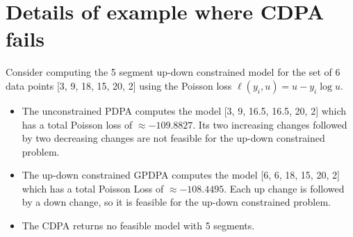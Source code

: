\documentclass{article}
\begin{document}
\section{Details of example where CDPA fails}

Consider computing the 5 segment up-down constrained model for the set
of 6 data points [3, 9, 18, 15, 20, 2] using the Poisson loss
$\ell(y_i, u)=u-y_i\log u$. 
\begin{itemize}
\item The unconstrained PDPA computes the model [3, 9, 16.5, 16.5, 20,
  2] which has a total Poisson loss of $\approx -109.8827$. Its two increasing
  changes followed by two decreasing changes are not feasible for the
  up-down constrained problem.
\item The up-down constrained GPDPA computes the model [6, 6, 18, 15,
  20, 2] which has a total Poisson Loss of $\approx -108.4495$. Each
  up change is followed by a down change, so it is feasible for the
  up-down constrained problem.
\item The CDPA returns no feasible model with 5 segments.
\end{itemize}
\end{document}
